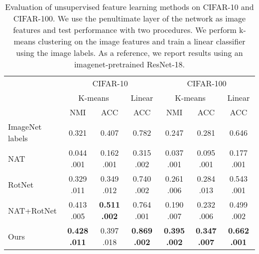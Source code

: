 \documentclass[a4paper,conference]{IEEEtran}
\begin{document}
\begin{table*}[t]
\begin{center}
\small
\caption{\protect\justify Evaluation of unsupervised feature learning methods on CIFAR-10 and CIFAR-100. We use the penultimate layer of the network as image features and test performance with two procedures. We perform k-means clustering on the image features and train a linear classifier using the image labels. As a reference, we report results using an imagenet-pretrained  ResNet-18.}
\label{table:nat_rotnet}
\begin{tabular}{l c c c c c c}
\toprule
& \multicolumn{3}{c}{CIFAR-10} & \multicolumn{3}{c}{CIFAR-100} \\
& \multicolumn{2}{c}{K-means} & Linear & \multicolumn{2}{c}{K-means} & Linear \\
& NMI & ACC & ACC & NMI & ACC & ACC \\
\midrule
ImageNet labels & 0.321 & 0.407 & 0.782 & 0.247 & 0.281 & 0.646 \\
\midrule
NAT & 0.044  .001 & 0.162  .001 & 0.315  .002 & 0.037  .001 & 0.095  .001 & 0.177  .001 \\
RotNet & 0.329  .011 & 0.349  .012 & 0.740  .002 & 0.261  .006 & 0.284  .013 & 0.543  .001 \\
NAT+RotNet & 0.413  .005 & \textbf{0.511  .002} & 0.764  .001 & 0.190  .007 & 0.232  .006 & 0.499  .002 \\
\midrule
Ours & \textbf{0.428  .011} & 0.397  .018 & \textbf{0.869  .002} & \textbf{0.395  .002} & \textbf{0.347  .007} & \textbf{0.662  .001} \\
\bottomrule
\end{tabular}

\end{center}
\end{table*}
\end{document}
